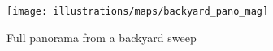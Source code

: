 
\begin{figure}[H]
  \caption{Full panorama from a backyard sweep}
  \label{fig:BackyardPanoStitch}
  \centering
    \texttt{[image: illustrations/maps/backyard\_pano\_mag]}
\end{figure}

